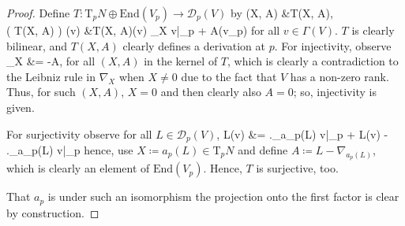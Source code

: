 \begin{proof}
\leavevmode\newline
Define $T: \mathrm{T}_pN \oplus \mathrm{End}(V_p) \to \mathcal{D}_p(V)$ by
\ba 
(X, A) &\mapsto T(X, A), 
\nonumber\\ \label{EqFibrewisesupderduperisomorphismofderivations}
\mleft( T(X, A) \mright) (v) 
&\coloneqq T(X, A)(v) \coloneqq 
\nabla_X v|_p + A(v_p)
\ea
for all $v \in \Gamma(V)$. $T$ is clearly bilinear, and $T(X,A)$ clearly defines a derivation at $p$. For injectivity, observe
\bas
\nabla_X
&=
-A,
\eas
for all $(X, A)$ in the kernel of $T$, which is clearly a contradiction to the Leibniz rule in $\nabla_X$ when $X \neq 0$ due to the fact that $V$ has a non-zero rank. Thus, for such $(X,A)$, $X=0$ and then clearly also $A=0$; so, injectivity is given.

For surjectivity observe for all $L \in \mathcal{D}_p(V)$, 
\bas
L(v)
&=
\mleft.\nabla_{a_p(L)} v\mright|_p
	+ L(v) - \mleft.\nabla_{a_p(L)} v\mright|_p
\eas
hence, use $X \coloneqq a_p(L) \in \mathrm{T}_pN$ and define $A \coloneqq L - \nabla_{a_p(L)}$, which is clearly an element of $\mathrm{End}(V_p)$. Hence, $T$ is surjective, too.

That $a_p$ is under such an isomorphism the projection onto the first factor is clear by construction.
%
\end{proof}


